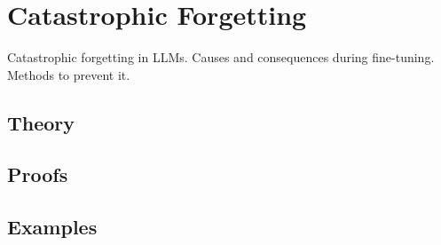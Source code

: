 
\section{Catastrophic Forgetting}
\label{sec:2.5.08-catastrophic-forgetting}

\begin{ticket}
Catastrophic forgetting in LLMs. Causes and consequences during fine-tuning. Methods to prevent it.
\end{ticket}

\subsection*{Theory}

\subsection*{Proofs}

\subsection*{Examples}
